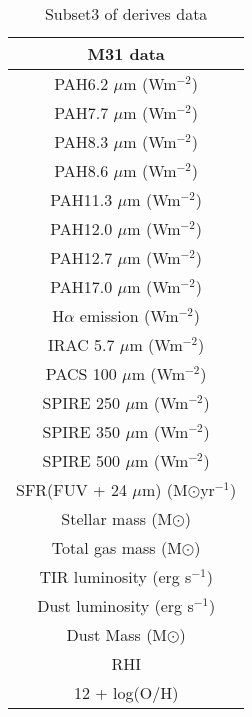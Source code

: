 \begin{table}
\centering
\caption{Subset3 of derives data}
\label{tab: subset3}
\begin{tabular}{ |c| }
\hline
M31 data  \\
\hline\hline
PAH6.2 $\mu$m (Wm$^{-2}$)  \\
PAH7.7 $\mu$m (Wm$^{-2}$)  \\
PAH8.3 $\mu$m (Wm$^{-2}$)  \\
PAH8.6 $\mu$m (Wm$^{-2}$)  \\
PAH11.3 $\mu$m (Wm$^{-2}$)  \\
PAH12.0 $\mu$m (Wm$^{-2}$) \\
PAH12.7 $\mu$m (Wm$^{-2}$)  \\
PAH17.0 $\mu$m (Wm$^{-2}$)  \\
H$\alpha$ emission (Wm$^{-2}$) \\
IRAC 5.7 $\mu$m (Wm$^{-2}$)\\
PACS 100 $\mu$m (Wm$^{-2}$)\\
SPIRE 250 $\mu$m (Wm$^{-2}$)\\
SPIRE 350 $\mu$m (Wm$^{-2}$)\\
SPIRE 500 $\mu$m (Wm$^{-2}$)\\
SFR(FUV + 24 $\mu$m) (M$\odot$yr$^{-1}$) \\
Stellar mass (M$\odot$)\\
Total gas mass (M$\odot$)  \\
TIR luminosity (erg s$^{-1}$)  \\
Dust luminosity (erg s$^{-1}$)  \\
Dust Mass (M$\odot$)\\
RHI \\
12 + log(O/H)\\
\hline
\end{tabular}
\end{table}